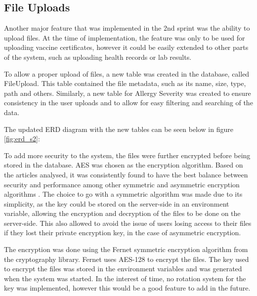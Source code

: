 \subsection{File Uploads}

Another major feature that was implemented in the 2nd sprint was the ability to upload files. At the time of implementation, the feature was only to be used for uploading vaccine certificates, however it could be easily extended to other parts of the system, such as uploading health records or lab results.

To allow a proper upload of files, a new table was created in the database, called FileUpload. This table contained the file metadata, such as its name, size, type, path and others. Similarly, a new table for Allergy Severity was created to ensure consistency in the user uploads and to allow for easy filtering and searching of the data.

The updated ERD diagram with the new tables can be seen below in figure \ref{fig:erd_s2}:

\noindent\begin{minipage}{\textwidth}
  \begin{center}
      \label{fig:erd_s2}
  \end{center}
\end{minipage}

To add more security to the system, the files were further encrypted before being stored in the database. AES was chosen as the encryption algorithm. Based on the articles analysed, it was consistently found to have the best balance between security and performance among other symmetric and asymmetric encryption algorithms \parencite{crypt1,crypt2,crypt3}. The choice to go with a symmetric algorithm was made due to its simplicity, as the key could be stored on the server-side in an environment variable, allowing the encryption and decryption of the files to be done on the server-side. This also allowed to avoid the issue of users losing access to their files if they lost their private encryption key, in the case of asymmetric encryption.

The encryption was done using the Fernet symmetric encryption algorithm from the cryptography library. Fernet uses AES-128 to encrypt the files. The key used to encrypt the files was stored in the environment variables and was generated when the system was started. In the interest of time, no rotation system for the key was implemented, however this would be a good feature to add in the future. 

